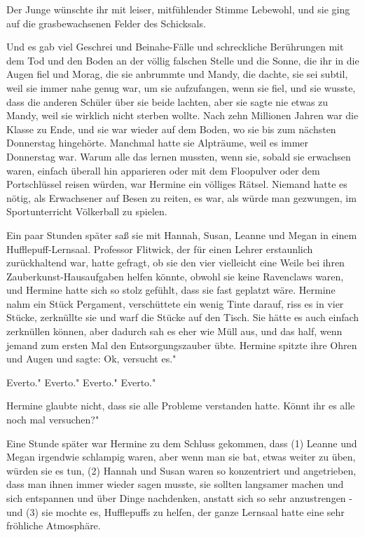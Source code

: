 Der Junge wünschte ihr mit leiser, mitfühlender Stimme Lebewohl, und sie ging
auf die grasbewachsenen Felder des Schicksals.

Und es gab viel Geschrei und Beinahe-Fälle und schreckliche Berührungen mit dem
Tod und den Boden an der völlig falschen Stelle und die Sonne, die ihr in die
Augen fiel und Morag, die sie anbrummte und Mandy, die dachte, sie sei subtil,
weil sie immer nahe genug war, um sie aufzufangen, wenn sie fiel, und sie
wusste, dass die anderen Schüler über sie beide lachten, aber sie sagte nie
etwas zu Mandy, weil sie wirklich nicht sterben wollte. Nach zehn Millionen
Jahren war die Klasse zu Ende, und sie war wieder auf dem Boden, wo sie bis zum
nächsten Donnerstag hingehörte. Manchmal hatte sie Alpträume, weil es immer
Donnerstag war. Warum alle das lernen mussten, wenn sie, sobald sie erwachsen
waren, einfach überall hin apparieren oder mit dem Floopulver oder dem
Portschlüssel reisen würden, war Hermine ein völliges Rätsel. Niemand hatte es
nötig, als Erwachsener auf Besen zu reiten, es war, als würde man gezwungen, im
Sportunterricht Völkerball zu spielen.

Ein paar Stunden später saß sie mit Hannah, Susan, Leanne und Megan in einem
Hufflepuff-Lernsaal. Professor Flitwick, der für einen Lehrer erstaunlich
zurückhaltend war, hatte gefragt, ob sie den vier vielleicht eine Weile bei
ihren Zauberkunst-Hausaufgaben helfen könnte, obwohl sie keine Ravenclaws waren,
und Hermine hatte sich so stolz gefühlt, dass sie fast geplatzt wäre. Hermine
nahm ein Stück Pergament, verschüttete ein wenig Tinte darauf, riss es in vier
Stücke, zerknüllte sie und warf die Stücke auf den Tisch. Sie hätte es auch
einfach zerknüllen können, aber dadurch sah es eher wie Müll aus, und das half,
wenn jemand zum ersten Mal den Entsorgungszauber übte. Hermine spitzte ihre
Ohren und Augen und sagte: \glqq{}Ok, versucht es."

\glqq{}Everto." \glqq{}Everto." \glqq{}Everto." \glqq{}Everto."

Hermine glaubte nicht, dass sie alle Probleme verstanden hatte. \glqq{}Könnt ihr
es alle noch mal versuchen?"

Eine Stunde später war Hermine zu dem Schluss gekommen, dass (1) Leanne und
Megan irgendwie schlampig waren, aber wenn man sie bat, etwas weiter zu üben,
würden sie es tun, (2) Hannah und Susan waren so konzentriert und angetrieben,
dass man ihnen immer wieder sagen musste, sie sollten langsamer machen und sich
entspannen und über Dinge nachdenken, anstatt sich so sehr anzustrengen - und
(3) sie mochte es, Hufflepuffs zu helfen, der ganze Lernsaal hatte eine sehr
fröhliche Atmosphäre.

